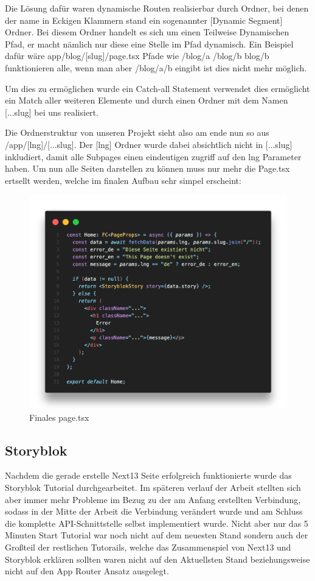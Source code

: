 Die Lösung dafür waren dynamische Routen realisierbar durch Ordner, bei denen der name in Eckigen Klammern stand ein sogenannter [Dynamic Segment] Ordner. Bei diesem Ordner handelt es sich um einen Teilweise Dynamischen Pfad, er macht nämlich nur diese eine Stelle im Pfad dynamisch. Ein Beispiel dafür wäre app/blog/[slug]/page.tsx Pfade wie /blog/a /blog/b blog/b funktionieren alle, wenn man aber /blog/a/b eingibt ist dies nicht mehr möglich. 

Um dies zu ermöglichen wurde ein Catch-all Statement verwendet dies ermöglicht ein Match aller weiteren Elemente und durch einen Ordner mit dem Namen [...slug] bei uns realisiert.

Die Ordnerstruktur von unseren Projekt sieht also am ende nun so aus /app/[lng]/[...slug]. Der [lng] Ordner wurde dabei absichtlich nicht in [...slug] inkludiert, damit alle Subpages einen eindeutigen zugriff auf den lng Parameter haben. Um nun alle Seiten darstellen zu können muss nur mehr die Page.tsx ertsellt werden, welche im finalen Aufbau sehr simpel erscheint:


\begin{figure}[h]
    \centering
    \includegraphics[width=\linewidth]{pics/final-page.png}
    \caption{Finales page.tsx}
\end{figure}

\subsection{Storyblok}
Nachdem die gerade erstelle Next13 Seite erfolgreich funktionierte wurde das Storyblok Tutorial durchgearbeitet. Im späteren verlauf der Arbeit stellten sich aber immer mehr Probleme im Bezug zu der am Anfang erstellten Verbindung, sodass in der Mitte der Arbeit die Verbindung verändert wurde und am Schluss die komplette API-Schnittstelle selbst implementiert wurde.
Nicht aber nur das 5 Minuten Start Tutorial war noch nicht auf dem neuesten Stand sondern auch der Großteil der restlichen Tutorails, welche das Zusammenspiel von Next13 und Storyblok erklären sollten waren nicht auf den Aktuellsten Stand beziehungsweise nicht auf den App Router Ansatz ausgelegt.



